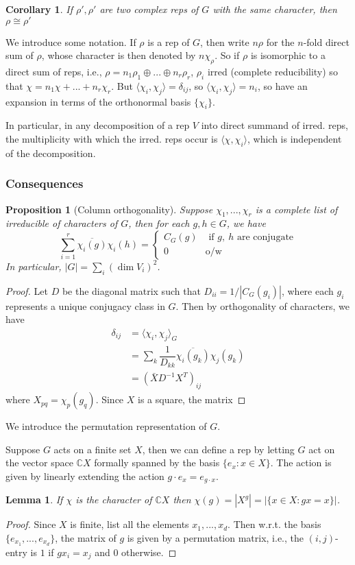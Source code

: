 \documentclass{article}
\theoremstyle{definition}
\theoremstyle{remark}
\theoremstyle{plain}
\newtheorem{lem}[defn]{Lemma}
\newtheorem{prop}[defn]{Proposition}
\newtheorem{crly}[defn]{Corollary}
\newcommand{\CC}{\mathbb{C}}
\begin{document}
\begin{crly}
    If $\rho',\rho'$ are two complex reps of $G$ with the same character, then $\rho\cong\rho'$
\end{crly}

We introduce some notation. If $\rho$ is a rep of $G$, then write $n\rho$ for the $n$-fold direct sum of $\rho$, whose character is then denoted by $n\chi_\rho$. So if $\rho$ is isomorphic to a direct sum of reps, i.e., $\rho=n_1\rho_1\oplus...\oplus n_r\rho_r$, $\rho_i$ irred (complete reducibility) so that $\chi=n_1\chi+...+n_r\chi_r$. But $\langle\chi_i,\chi_j\rangle=\delta_{ij}$, so $\langle\chi_i,\chi_j\rangle=n_i$, so have an expansion in terms of the orthonormal basis $\{\chi_i\}$.

In particular, in any decomposition of a rep $V$ into direct summand of irred. reps, the multiplicity with which the irred. reps occur is $\langle\chi,\chi_i\rangle$, which is independent of the decomposition.
\subsubsection{Consequences}
\begin{prop}[Column orthogonality]
    Suppose $\chi_1,...,\chi_r$ is a complete list of irreducible of characters of $G$, then for each $g,h\in G$, we have
    \[\sum_{i=1}^r\overline{\chi_i(g)}\chi_i(h)=\begin{cases}
        C_G(g) & \text{ if }g,\ h\text{ are conjugate}\\
        0 & \text{o/w}
    \end{cases}\]
    In particular, $|G|=\sum_i(\dim V_i)^2$.
\end{prop}
\begin{proof}
    Let $D$ be the diagonal matrix such that $D_{ii}=1/|C_G(g_i)|$, where each $g_i$ represents a unique conjugacy class in $G$. Then by orthogonality of characters, we have
    \begin{align*}
        \delta_{ij}&=\langle\chi_i,\chi_j\rangle_G\\
        &=\sum_k\dfrac{1}{D_{kk}}\overline{\chi_i(g_k)}\chi_j(g_k)\\
        &=(\bar XD^{-1}X^T)_{ij}
    \end{align*}
    where $X_{pq}=\chi_p(g_q)$. Since $X$ is a square, the matrix
\end{proof}
We introduce the permutation representation of $G$.

Suppose $G$ acts on a finite set $X$, then we can define a rep by letting $G$ act on the vector space $\CC X$ formally spanned by the basis $\{e_x:x\in X\}$. The action is given by linearly extending the action $g\cdot e_x=e_{g\cdot x}$.
\begin{lem}
    If $\chi$ is the character of $\CC X$ then $\chi(g)=|X^g|=|\{x\in X:gx=x\}|$.
\end{lem}
\begin{proof}
    Since $X$ is finite, list all the elements $x_1,...,x_d$. Then w.r.t. the basis $\{e_{x_1},...,e_{x_d}\}$, the matrix of $g$ is given by a permutation matrix, i.e., the $(i,j)$-entry is $1$ if $gx_i=x_j$ and $0$ otherwise.
\end{proof}
\end{document}

